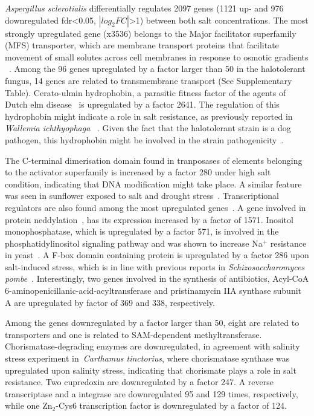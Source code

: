 \documentclass[jof,article,submit,moreauthors,pdftex,10pt,a4paper]{Definitions/mdpi}
\newcommand{\walIch}{\textit{Wallemia ichthyophaga}}
\newcommand{\schPom}{\textit{Schizosaccharomyces pombe}}
\newcommand{\phiScl}{\textit{Aspergillus sclerotialis}}
\begin{document}
\phiScl{} differentially regulates 2097 genes (1121 up- and 976 downregulated fdr<0.05, $|log_{2}FC|$>1) between both salt concentrations. The most strongly upregulated gene (x3536) belongs to the Major facilitator superfamily (MFS) transporter, which are membrane transport proteins that facilitate movement of small solutes across cell membranes in response to osmotic gradients ~\cite{Pao1998}. Among the 96 genes upregulated by a factor larger than 50 in the halotolerant fungus, 14 genes are related to transmembrane transport (See Supplementary Table). Cerato-ulmin hydrophobin, a parasitic fitness factor of the agents of Dutch elm disease~\cite{Temple1997} is upregulated by a factor 2641. The regulation of this hydrophobin might indicate a role in salt resistance, as previously reported in \walIch{} ~\cite{Plemenitas2014}. Given the fact that the halotolerant strain is a dog pathogen, this hydrophobin might be involved in the strain pathogenicity~\cite{Sigler2010}.

The C-terminal dimerisation domain found in tranposases of elements belonging to the activator superfamily is increased by a factor 280 under high salt condition, indicating that DNA modification might take place. A similar feature was seen in sunflower exposed to salt and drought stress~\cite{Liu2003}. Transcriptional regulators are also found among the most upregulated genes~\cite{Shelest2017}. A gene involved in protein neddylation~\cite{Yashiroda2003}, has its expression increased by a factor of 1571.  Inositol monophosphatase, which is upregulated by a factor 571, is involved in the phosphatidylinositol signaling pathway and was shown to increase Na$^+$ resistance in yeast~\cite{Lopez1999}.  A F-box domain containing protein is upregulated by a factor 286 upon salt-induced stress, which is in line with previous reports in \schPom{}~\cite{Hermand2006}. Interestingly, two genes involved in the synthesis of antibiotics, Acyl-CoA 6-aminopenicillanic-acid-acyltransferase and pristinamycin IIA synthase subunit A are upregulated by factor of 369 and 338, respectively.

Among the genes downregulated by a factor larger than 50, eight are related to transporters and one is related to SAM-dependent methyltransferase. Chorismatase-degrading enzymes are downregulated, in agreement with salinity stress experiment in~\textit{Carthamus tinctorius}\cite{Sadeghi2013}, where chorismatase synthase was upregulated upon salinity stress, indicating that chorismate plays a role in salt resistance. Two cupredoxin are downregulated by a factor 247. A reverse transcriptase and a integrase are downregulated 95 and 129 times, respectively, while one Zn$_2$-Cys6 transcription factor is downregulated by a factor of 124.
\end{document}

